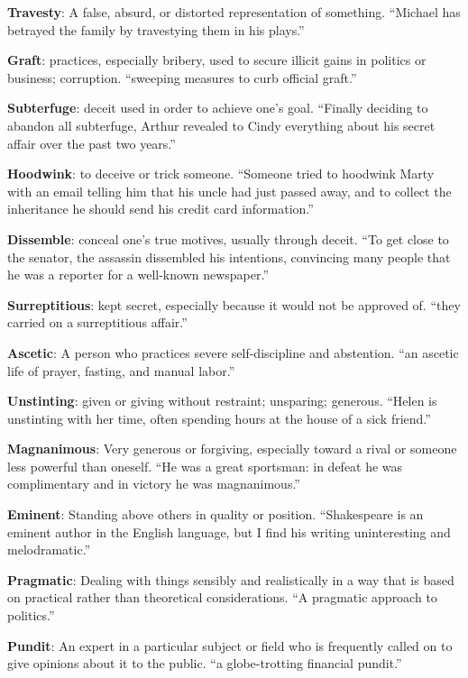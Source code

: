 \documentclass[12pt, a4paper]{ximera}
\begin{document}
\textbf{Travesty}: A false, absurd, or distorted representation of something. ``Michael has betrayed the family by travestying them in his plays.''

\textbf{Graft}: practices, especially bribery, used to secure illicit gains in politics or business; corruption. ``sweeping measures to curb official graft.''

\textbf{Subterfuge}: deceit used in order to achieve one's goal. ``Finally deciding to abandon all subterfuge, Arthur revealed to Cindy everything about his secret affair over the past two years.''

\textbf{Hoodwink}: to deceive or trick someone. ``Someone tried to hoodwink Marty with an email telling him that his uncle had just passed away, and to collect the inheritance he should send his credit card information.''

\textbf{Dissemble}: conceal one's true motives, usually through deceit. ``To get close to the senator, the assassin dissembled his intentions, convincing many people that he was a reporter for a well-known newspaper.''

\textbf{Surreptitious}: kept secret, especially because it would not be approved of. ``they carried on a surreptitious affair.''

\textbf{Ascetic}: A person who practices severe self-discipline and abstention. ``an ascetic life of prayer, fasting, and manual labor.''

\textbf{Unstinting}: given or giving without restraint; unsparing; generous. ``Helen is unstinting with her time, often spending hours at the house of a sick friend.''

\textbf{Magnanimous}: Very generous or forgiving, especially toward a rival or someone less powerful than oneself. ``He was a great sportsman: in defeat he was complimentary and in victory he was magnanimous.''

\textbf{Eminent}: Standing above others in quality or position. ``Shakespeare is an eminent author in the English language, but I find his writing uninteresting and melodramatic.''

\textbf{Pragmatic}: Dealing with things sensibly and realistically in a way that is based on practical rather than theoretical considerations. ``A pragmatic approach to politics.''

\textbf{Pundit}: An expert in a particular subject or field who is frequently called on to give opinions about it to the public. ``a globe-trotting financial pundit.''
\end{document}

